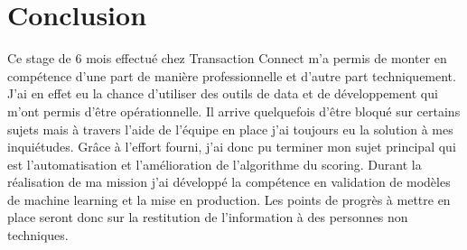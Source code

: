 \chapter*{Conclusion}

Ce stage de 6 mois effectué chez Transaction Connect m’a permis de monter en compétence d’une part de manière professionnelle et d’autre part techniquement. J’ai en effet eu la chance d'utiliser des outils de data et de développement qui m’ont permis d'être opérationnelle. Il arrive quelquefois d'être bloqué sur certains sujets mais à travers l'aide de l’équipe en place j’ai toujours eu la solution à mes inquiétudes. Grâce à l'effort fourni, j’ai donc pu terminer mon sujet principal qui est l’automatisation et l’amélioration de l’algorithme du scoring.
Durant la réalisation de ma mission j’ai développé la compétence en validation de modèles de machine learning et la mise en production. Les points de progrès à mettre en place seront donc sur la restitution de l’information à des personnes non techniques. 

